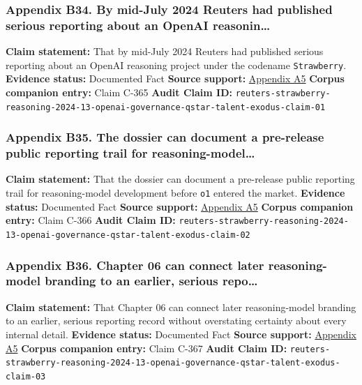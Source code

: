 \documentclass[
  american,
  11pt,
  letterpaper,
]{article}
\begin{document}
\subsubsection{Appendix B34. By mid-July 2024 Reuters had published
serious reporting about an OpenAI
reasonin\ldots{}}\label{appendix-b34-by-mid-july-2024-reuters-had-published-serious-reporting-about-an-openai-reasonin}

\textbf{Claim statement:} That by mid-July 2024 Reuters had published
serious reporting about an OpenAI reasoning project under the codename
\texttt{Strawberry}. \textbf{Evidence status:} Documented Fact
\textbf{Source support:}
\hyperref[appendix-a5-exclusive-openai-working-on-new-reasoning-technology-under-code-name-strawberry]{Appendix
A5} \textbf{Corpus companion entry:} Claim C-365 \textbf{Audit Claim
ID:}
\texttt{reuters-strawberry-reasoning-2024-13-openai-governance-qstar-talent-exodus-claim-01}

\subsubsection{Appendix B35. The dossier can document a pre-release
public reporting trail for
reasoning-model\ldots{}}\label{appendix-b35-the-dossier-can-document-a-pre-release-public-reporting-trail-for-reasoning-model}

\textbf{Claim statement:} That the dossier can document a pre-release
public reporting trail for reasoning-model development before
\texttt{o1} entered the market. \textbf{Evidence status:} Documented
Fact \textbf{Source support:}
\hyperref[appendix-a5-exclusive-openai-working-on-new-reasoning-technology-under-code-name-strawberry]{Appendix
A5} \textbf{Corpus companion entry:} Claim C-366 \textbf{Audit Claim
ID:}
\texttt{reuters-strawberry-reasoning-2024-13-openai-governance-qstar-talent-exodus-claim-02}

\subsubsection{Appendix B36. Chapter 06 can connect later
reasoning-model branding to an earlier, serious
repo\ldots{}}\label{appendix-b36-chapter-06-can-connect-later-reasoning-model-branding-to-an-earlier-serious-repo}

\textbf{Claim statement:} That Chapter 06 can connect later
reasoning-model branding to an earlier, serious reporting record without
overstating certainty about every internal detail. \textbf{Evidence
status:} Documented Fact \textbf{Source support:}
\hyperref[appendix-a5-exclusive-openai-working-on-new-reasoning-technology-under-code-name-strawberry]{Appendix
A5} \textbf{Corpus companion entry:} Claim C-367 \textbf{Audit Claim
ID:}
\texttt{reuters-strawberry-reasoning-2024-13-openai-governance-qstar-talent-exodus-claim-03}
\end{document}
